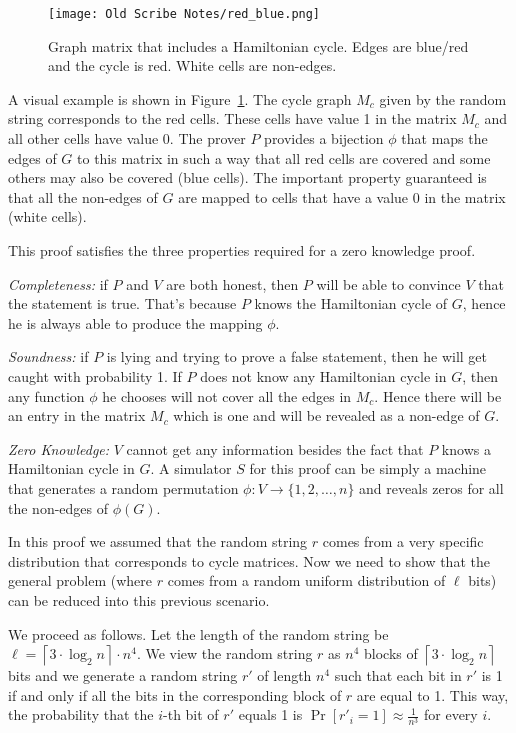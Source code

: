 \begin{figure}[ht]
	\centering
		\texttt{[image: Old Scribe Notes/red\_blue.png]}
	\caption{Graph matrix that includes a Hamiltonian cycle. Edges are blue/red and the
                 cycle is red. White cells are non-edges.}
	\label{fig:red_blue}
\end{figure}

A visual example is shown in Figure~\ref{fig:red_blue}. The cycle graph $M_c$ given by the
random string corresponds to the red cells. These cells have value 1 in the matrix $M_c$ and
all other cells have value 0. The prover $P$ provides a bijection $\phi$ that
maps the edges of $G$ to this matrix in such a way that all red cells are covered and
some others may also be covered (blue cells). The important property guaranteed is that
all the non-edges of $G$ are mapped to cells that have a value 0 in the matrix (white cells).

This proof satisfies the three properties required for a zero knowledge proof.

\textit{Completeness:} if $P$ and $V$ are both honest, then $P$ will be able to convince
$V$ that the statement is true. That's because $P$ knows the Hamiltonian cycle of $G$,
hence he is always able to produce the mapping $\phi$.

\textit{Soundness:} if $P$ is lying and trying to prove a false statement, then he will
get caught with probability 1. If $P$ does not know any Hamiltonian cycle in $G$, then
any function $\phi$ he chooses will not cover all the edges in $M_c$. Hence there will
be an entry in the matrix $M_c$ which is one and will be revealed as a non-edge of $G$.

\textit{Zero Knowledge:} $V$ cannot get any information besides the fact that $P$
knows a Hamiltonian cycle in $G$. A simulator $S$ for this proof can be simply a machine
that generates a random permutation $\phi:V\rightarrow \{1,2,\ldots,n\}$ and reveals zeros
for all the non-edges of $\phi(G)$.

\vspace{5mm}

In this proof we assumed that the random string $r$ comes from a very specific distribution
that corresponds to cycle matrices.
Now we need to show that the general problem (where $r$ comes from a
random uniform distribution of $\ell$ bits) can be reduced into this previous scenario.

We proceed as follows.
Let the length of the random string be
$\ell=\left\lceil 3\cdot \log_2 n\right\rceil \cdot n^4$.
We view the random string $r$ as $n^4$ blocks of $\left\lceil 3\cdot \log_2 n\right\rceil$
bits and we generate a random string $r'$ of length $n^4$ such that each bit in $r'$
is 1 if and only if all the bits in the corresponding block of $r$ are equal to 1.
This way, the probability that the $i$-th bit of $r'$ equals 1 is $\Pr[r'_i=1]\approx\frac{1}{n^3}$ for every $i$.

